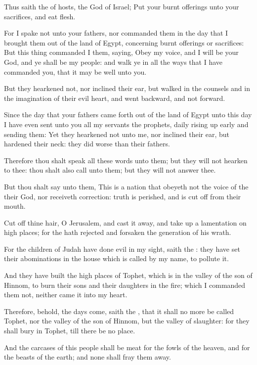 \verse Thus saith the \LORD of hosts, the God of Israel; Put your burnt offerings unto your sacrifices, and eat flesh.

\verse For I spake not unto your fathers, nor commanded them in the day that I brought them out of the land of Egypt, concerning burnt offerings or sacrifices: \verse But this thing commanded I them, saying, Obey my voice, and I will be your God, and ye shall be my people: and walk ye in all the ways that I have commanded you, that it may be well unto you.

\verse But they hearkened not, nor inclined their ear, but walked in the counsels and in the imagination of their evil heart, and went backward, and not forward.

\verse Since the day that your fathers came forth out of the land of Egypt unto this day I have even sent unto you all my servants the prophets, daily rising up early and sending them: \verse Yet they hearkened not unto me, nor inclined their ear, but hardened their neck: they did worse than their fathers.

\verse Therefore thou shalt speak all these words unto them; but they will not hearken to thee: thou shalt also call unto them; but they will not answer thee.

\verse But thou shalt say unto them, This is a nation that obeyeth not the voice of the \LORD their God, nor receiveth correction: truth is perished, and is cut off from their mouth.

\verse Cut off thine hair, O Jerusalem, and cast it away, and take up a lamentation on high places; for the \LORD hath rejected and forsaken the generation of his wrath.

\verse For the children of Judah have done evil in my sight, saith the \LORD: they have set their abominations in the house which is called by my name, to pollute it.

\verse And they have built the high places of Tophet, which is in the valley of the son of Hinnom, to burn their sons and their daughters in the fire; which I commanded them not, neither came it into my heart.

\verse Therefore, behold, the days come, saith the \LORD, that it shall no more be called Tophet, nor the valley of the son of Hinnom, but the valley of slaughter: for they shall bury in Tophet, till there be no place.

\verse And the carcases of this people shall be meat for the fowls of the heaven, and for the beasts of the earth; and none shall fray them away.


